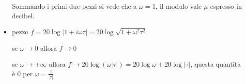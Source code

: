 \begin{itemize}
\begin{figure}[htpb]
\begin{tikzpicture}[x=0.75pt,y=0.75pt,yscale=-1,xscale=1]
	      		
	      	\end{tikzpicture}
	      \end{figure}\FloatBarrier
	      
	      
	      Sommando i primi due pezzi si vede che a $\omega =1$, il modulo vale $\mu $ espresso in decibel.
	\item pezzo ${\textstyle f=20\log| 1+i\omega \tau | =20\log\sqrt{1+\omega ^2 \tau ^2}}$
	      
	      se $\omega \to 0$ allora $f \to 0$
	      
	      se $\omega \to +\infty$ allora $f\to 20\log(\omega | \tau |) =20\log \omega +20\log| \tau | $, questa quantità è $0$ per $\omega =\frac{1}{| \tau | }$
	      
	      \begin{figure}[htpb]\centering
	      	
	      	\begin{tikzpicture}[x=0.75pt,y=0.75pt,yscale=-1,xscale=1]
	      		

\end{tikzpicture}
\end{figure}
\end{itemize}
